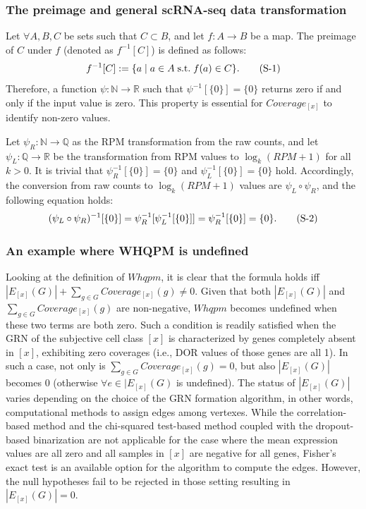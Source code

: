 \documentclass{article}
\begin{document}
\subsubsection*{
  The preimage and general scRNA-seq data transformation
}
Let $\forall A,B,C$ be sets such that $C\subset B$, and let $f:A\rightarrow B$ be a map. The preimage of $C$ under $f$ (denoted as 
$f^{-1}[C]$) is defined as follows:
\begin{equation}\label{preimage}
  f^{-1}[C]:=\{a\;|\;a\in A\;\text{s.t.}\;f(a)\in C\}.
  \stepcounter{equation} \tag{S-\theequation}
\end{equation}
Therefore, a function $\psi: \mathbb{N}\rightarrow\mathbb{R}$ such that $\psi^{-1}[\{0\}]=\{0\}$ returns zero 
if and only if the input value is zero. This property is essential for $Coverage_{[x]}$ to identify non-zero values.

Let $\psi_R:\mathbb{N}\rightarrow \mathbb{Q}$ as the RPM transformation from the raw counts, and let $\psi_L:\mathbb{Q}\rightarrow \mathbb{R}$ be the transformation 
from RPM values to $\log_k(RPM+1)$ for all $k>0$. It is trivial that $\psi_R^{-1}[\{0\}]=\{0\}$ and $\psi_L^{-1}[\{0\}]=\{0\}$ hold.
Accordingly, the conversion from raw counts to $\log_k(RPM+1)$ values are $\psi_L\circ\psi_R$, and the following equation holds:
\begin{equation}\label{raw2logrpm}
  (\psi_L\circ\psi_R)^{-1}[\{0\}]=\psi_R^{-1}[\psi_L^{-1}[\{0\}]]=\psi_R^{-1}[\{0\}]=\{0\}.
  \stepcounter{equation} \tag{S-\theequation}
\end{equation}

\subsubsection*{
  An example where WHQPM is undefined
}
Looking at the definition of $Whqpm$, it is clear that the formula holds iff $|E_{[x]}(G)|+\sum_{g\in G}Coverage_{[x]}(g)\neq 0$. 
Given that both $|E_{[x]}(G)|$ and $\sum_{g\in G}Coverage_{[x]}(g)$ are non-negative, $Whqpm$ becomes undefined when these 
two terms are both zero. Such a condition is readily satisfied when the GRN of the subjective cell class $[x]$ is 
characterized by genes completely absent in $[x]$, exhibiting zero coverages (i.e., DOR values of those genes are all 
1). In such a case, not only is $\sum_{g\in G}Coverage_{[x]}(g)=0$, but also $|E_{[x]}(G)|$ becomes 0 (otherwise $\forall e\in|E_{[x]}(G)$ is 
undefined). The status of $|E_{[x]}(G)|$ varies depending on the choice of the GRN formation algorithm, in other words, 
computational methods to assign edges among vertexes. While the correlation-based method and the chi-squared 
test-based method coupled with the dropout-based binarization are not applicable for the case where the mean 
expression values are all zero and all samples in $[x]$ are negative for all genes, Fisher's exact test is an available 
option for the algorithm to compute the edges. However, the null hypotheses fail to be rejected in those setting 
resulting in $|E_{[x]}(G)|=0$.
\end{document}
